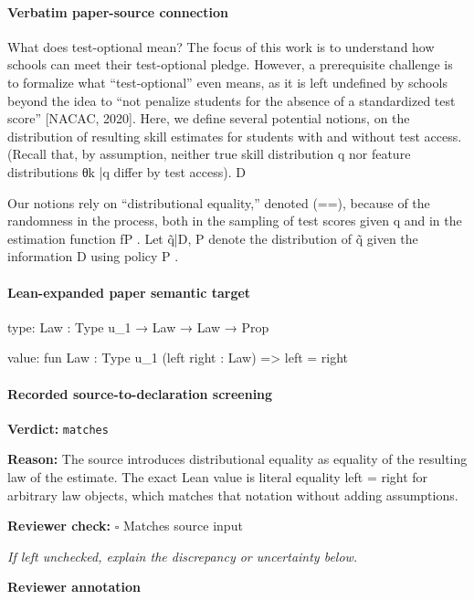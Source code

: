 \documentclass[10pt]{article}
\newcommand{\reviewerbox}{%
  \par\noindent\fbox{\parbox{0.96\linewidth}{\rule{0pt}{0.38in}}}\par
}
\newcommand{\reviewmatch}[1]{%
  \par\noindent\textbf{Reviewer check:} $\square$\; #1\par
  \noindent\emph{If left unchecked, explain the discrepancy or uncertainty below.}\par
}
\begin{document}
\paragraph{Verbatim paper-source connection}
\begin{ReviewVerbatim}
What does test-optional mean?
The focus of this work is to understand how schools can meet their test-optional pledge. However, a prerequisite challenge is to formalize what “test-optional” even means, as it is left undeﬁned by schools beyond the idea to “not penalize students for the absence of a standardized test
score” [NACAC, 2020]. Here, we deﬁne several potential notions, on the distribution of resulting
skill estimates for students with and without test access. (Recall that, by assumption, neither true
skill distribution q nor feature distributions θk |q diﬀer by test access).
D

Our notions rely on “distributional equality,” denoted (==), because of the randomness in the
process, both in the sampling of test scores given q and in the estimation function fP . Let q̃|D, P
denote the distribution of q̃ given the information D using policy P .
\end{ReviewVerbatim}



\paragraph{Lean-expanded paper semantic target}
\begin{ReviewVerbatim}
type:
{Law : Type u_1} → Law → Law → Prop

value:
fun {Law : Type u_1} (left right : Law) => left = right
\end{ReviewVerbatim}


\paragraph{Recorded source-to-declaration screening}
\textbf{Verdict:} \texttt{matches}
\\
{\raggedright
\textbf{Reason:} The source introduces distributional equality as equality of the resulting law of the estimate.\allowbreak{} The exact Lean value is literal equality left = right for arbitrary law objects, which matches that notation without adding assumptions.\allowbreak{}
\par}
\reviewmatch{Matches source input}
\noindent\textbf{Reviewer annotation}\par
\reviewerbox
\clearpage
\hypertarget{paper-prerequisite-ffee2d25a4a6f2f5}{}
\end{document}
